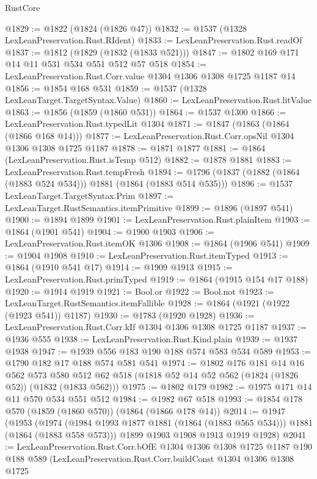 \begin{lexlean}{RustCore}
\begin{coremodule}
@1829 := @1822 (@1824 (@1826 @47))
@1832 := @1537 (@1328 LexLeanPreservation.Rust.RIdent)
@1833 := LexLeanPreservation.Rust.readOf
@1837 := @1812 (@1829 (@1832 (@1833 @521)))
@1847 := @1802 @169 @171 @14 @11 @531 @534 @551 @512 @57 @518
@1854 := LexLeanPreservation.Rust.Corr.value @1304 @1306 @1308 @1725 @1187 @14
@1856 := @1854 @168 @531
@1859 := @1537 (@1328 LexLeanTarget.TargetSyntax.Value)
@1860 := LexLeanPreservation.Rust.litValue
@1863 := @1856 (@1859 (@1860 @531))
@1864 := @1537 @1300
@1866 := LexLeanPreservation.Rust.typedLit @1304
@1871 := @1847 (@1863 (@1864 (@1866 @168 @14)))
@1877 := LexLeanPreservation.Rust.Corr.opsNil @1304 @1306 @1308 @1725 @1187
@1878 := @1871 @1877
@1881 := @1864 (LexLeanPreservation.Rust.isTemp @512)
@1882 := @1878 @1881
@1883 := LexLeanPreservation.Rust.tempFresh
@1894 := @1796 (@1837 (@1882 (@1864 (@1883 @524 @534))) @1881 (@1864 (@1883 @514 @535)))
@1896 := @1537 LexLeanTarget.TargetSyntax.Prim
@1897 := LexLeanTarget.RustSemantics.itemPrimitive
@1899 := @1896 (@1897 @541)
@1900 := @1894 @1899
@1901 := LexLeanPreservation.Rust.plainItem
@1903 := @1864 (@1901 @541)
@1904 := @1900 @1903
@1906 := LexLeanPreservation.Rust.itemOK @1306
@1908 := @1864 (@1906 @541)
@1909 := @1904 @1908
@1910 := LexLeanPreservation.Rust.itemTyped
@1913 := @1864 (@1910 @541 @17)
@1914 := @1909 @1913
@1915 := LexLeanPreservation.Rust.primTyped
@1919 := @1864 (@1915 @154 @17 @188)
@1920 := @1914 @1919
@1921 := Bool.or
@1922 := Bool.not
@1923 := LexLeanTarget.RustSemantics.itemFallible
@1928 := @1864 (@1921 (@1922 (@1923 @541)) @1187)
@1930 := @1783 (@1920 @1928)
@1936 := LexLeanPreservation.Rust.Corr.kIf @1304 @1306 @1308 @1725 @1187
@1937 := @1936 @555
@1938 := LexLeanPreservation.Rust.Kind.plain
@1939 := @1937 @1938
@1947 := @1939 @556 @183 @190 @188 @574 @583 @534 @589
@1953 := @1790 @182 @17 @188 @574 @581 @541
@1974 := @1802
    @176
    @181
    @14
    @16
    @562
    @573
    @580
    @512
    @62
    @518
    (@1818 @52 @14 @52 @562 (@1824 (@1826 @52)) (@1832 (@1833 @562)))
@1975 := @1802 @179
@1982 := @1975 @171 @14 @11 @570 @534 @551 @512
@1984 := @1982 @67 @518
@1993 := @1854 @178 @570 (@1859 (@1860 @570)) (@1864 (@1866 @178 @14))
@2014 := @1947
    (@1953
      (@1974 (@1984 @1993 @1877 @1881 (@1864 (@1883 @565 @534))) @1881 (@1864 (@1883 @558 @573)))
      @1899
      @1903
      @1908
      @1913
      @1919
      @1928)
@2041 := LexLeanPreservation.Rust.Corr.bOfE
    @1304
    @1306
    @1308
    @1725
    @1187
    @190
    @188
    @589
    (LexLeanPreservation.Rust.Corr.buildConst
      @1304
      @1306
      @1308
      @1725

\end{coremodule}
\end{lexlean}
